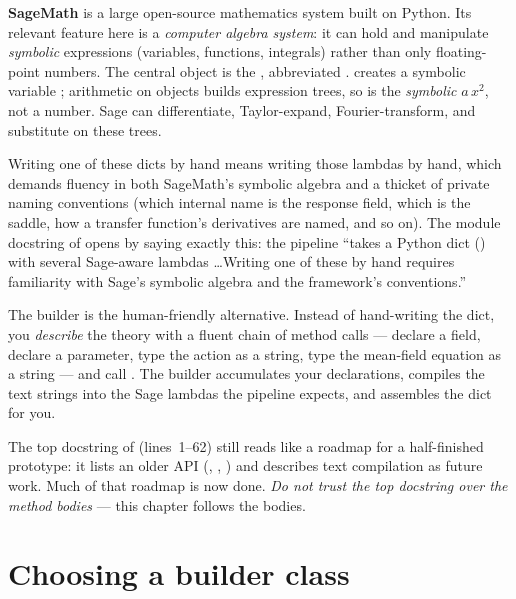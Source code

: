 \begin{defn}
\textbf{SageMath} is a large open-source mathematics system built on Python. Its
relevant feature here is a \emph{computer algebra system}: it can hold and
manipulate \emph{symbolic} expressions (variables, functions, integrals) rather
than only floating-point numbers. The central object is the ,
abbreviated .  creates a symbolic variable ;
arithmetic on  objects builds expression trees, so
 is the \emph{symbolic} $a\,x^{2}$, not a
number. Sage can differentiate, Taylor-expand, Fourier-transform, and substitute
on these trees.
\end{defn}

Writing one of these dicts by hand means writing those lambdas by hand, which
demands fluency in both SageMath's symbolic algebra and a thicket of private
naming conventions (which internal name is the response field, which is the
saddle, how a transfer function's derivatives are named, and so on). The module
docstring of  opens by saying exactly this: the
pipeline ``takes a Python dict () with several Sage-aware
lambdas \ldots Writing one of these by hand requires familiarity with Sage's
symbolic algebra and the framework's conventions.''

The builder is the human-friendly alternative. Instead of hand-writing the dict,
you \emph{describe} the theory with a fluent chain of method calls --- declare a
field, declare a parameter, type the action as a string, type the mean-field
equation as a string --- and call . The builder accumulates your
declarations, compiles the text strings into the Sage lambdas the pipeline
expects, and assembles the dict for you.

\begin{gotcha}
The top docstring of  (lines~1--62) still reads like a
roadmap for a half-finished prototype: it lists an older API
(, , ) and
describes text compilation as future work. Much of that roadmap is now done.
\emph{Do not trust the top docstring over the method bodies} --- this chapter
follows the bodies.
\end{gotcha}

\section{Choosing a builder class}

